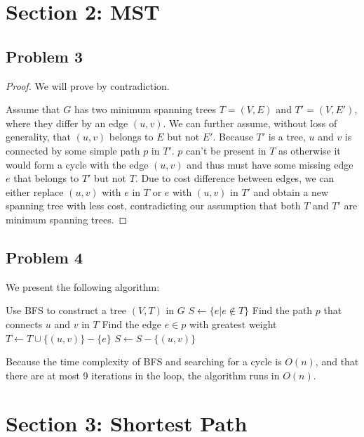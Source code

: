 \documentclass{article}
\begin{document}
\section*{Section 2: MST}

\subsection*{Problem 3}

\begin{proof}
    We will prove by contradiction.

    Assume that $G$ has two minimum spanning trees $T = (V, E)$ and $T' = (V, E')$, where they differ by an edge $(u, v)$. We can further assume, without loss of generality, that $(u, v)$ belongs to $E$ but not $E'$. Because $T'$ is a tree, $u$ and $v$ is connected by some simple path $p$ in $T'$. $p$ can't be present in $T$ as otherwise it would form a cycle with the edge $(u, v)$ and thus must have some missing edge $e$ that belongs to $T'$ but not $T$. Due to cost difference between edges, we can either replace $(u, v)$ with $e$ in $T$ or $e$ with $(u, v)$ in $T'$ and obtain a new spanning tree with less cost, contradicting our assumption that both $T$ and $T'$ are minimum spanning trees.
\end{proof}

\subsection*{Problem 4} 

We present the following algorithm:
\begin{algorithmic}[1]
    \State Use BFS to construct a tree $(V, T)$ in $G$
    \State $S \gets \{e| e \notin T\}$
        \State Find the path $p$ that connects $u$ and $v$ in $T$
        \State Find the edge $e \in p$ with greatest weight
            \State $T \gets T \cup \{(u, v)\} - \{e\}$
        \EndIf
        \State $S \gets S - \{(u, v)\}$
    \EndFor
\end{algorithmic}

Because the time complexity of BFS and searching for a cycle is $O(n)$, and that there are at most 9 iterations in the loop, the algorithm runs in $O(n)$.

\section*{Section 3: Shortest Path}
\end{document}
